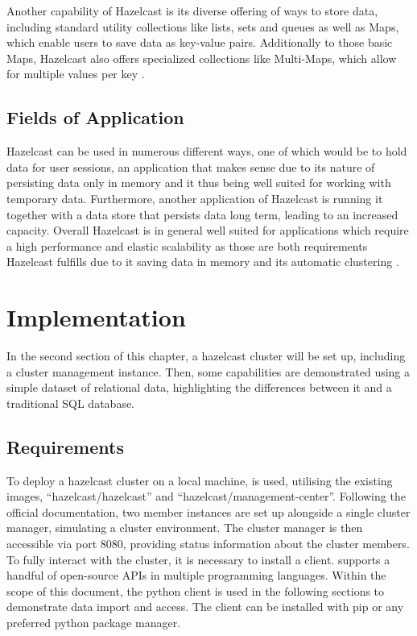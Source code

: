 Another capability of Hazelcast is its diverse offering of ways to store data, including standard utility collections like lists, sets and queues as well as Maps, which enable users to save data as key-value pairs. Additionally to those basic Maps, Hazelcast also offers
specialized collections like Multi-Maps, which allow for multiple values per key \parencite{Johns.2015}.

\subsection{Fields of Application} \label{subsec:fieldsOfApplicationHazelcast}

Hazelcast can be used in numerous different ways, one of which would be to hold data for user sessions, an application that makes sense due to its nature
of persisting data only in memory and it thus being well suited for working with temporary data. Furthermore, another application of Hazelcast is
running it together with a data store that persists data long term, leading to an increased capacity. Overall Hazelcast is in general well
suited for applications which require a high performance and elastic scalability as those are both requirements Hazelcast fulfills due to it saving data in memory and
its automatic clustering \parencite{Johns.2015}.

\section{Implementation} \label{sec:implementationHazelcast}

In the second section of this chapter, a hazelcast cluster will be set up, including a cluster management
instance. Then, some capabilities are demonstrated using a simple dataset of relational data, highlighting
the differences between it and a traditional SQL database.

\subsection{Requirements} \label{subsec:requirementsHazelcast}

To deploy a hazelcast cluster on a local machine, \textcite{Hazelcast.Docker.Hazelcast, Hazelcast.Docker.ManagementCenter} is used, utilising the existing images,
\enquote{hazelcast/hazelcast}  and \enquote{hazelcast/management-center}.
Following the official documentation, two member instances are set up alongside a single cluster manager,
simulating a cluster environment. The cluster manager is then accessible via port 8080, providing status
information about the cluster members. To fully interact with the cluster, it is necessary to install a
client. \textcite{Hazelcast.Clients} supports a handful of open-source APIs in multiple programming languages.
Within the scope of this document, the python client is
used in the following sections to demonstrate data import and access. The client can be installed with pip
or any preferred python package manager.

